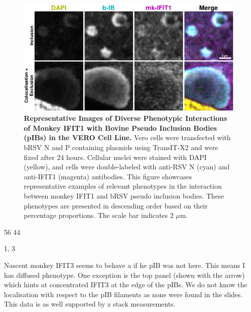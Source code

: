 \begin{figure}
    \centering
    \includegraphics[width=1\linewidth]{09. Chapter 4/Figs/01. pIB/02. IFIT1/09. i1-vero-bnbp.pdf}
    \caption[Representative Images of Diverse Phenotypic Interactions of Monkey IFIT1 with Bovine Pseudo Inclusion Bodies (pIBs) in the VERO Cell Line.]{\textbf{Representative Images of Diverse Phenotypic Interactions of Monkey IFIT1 with Bovine Pseudo Inclusion Bodies (pIBs) in the VERO Cell Line.} Vero cells were transfected with bRSV N and P containing plasmids using TransIT-X2 and were fixed after 24 hours. Cellular nuclei were stained with DAPI (yellow), and cells were double-labeled with anti-RSV N (cyan) and anti-IFIT1 (magenta) antibodies. This figure showcases representative examples of relevant phenotypes in the interaction between monkey IFIT1 and bRSV pseudo inclusion bodies. These phenotypes are presented in descending order based on their percentage proportions. The scale bar indicates 2 \(\mu \mbox{m}\).}
    \label{fig:Representative Images of Diverse Phenotypic Interactions of Monkey IFIT1 with Bovine Pseudo Inclusion Bodies (pIBs) in the VERO Cell Line}
\end{figure}

56 44

1, 3



Nascent monkey IFIT3 seems to behave a if he pIB was not here. This means I has diffused phenotype. One exception is the top panel (shown with the arrow) which hints at concentrated IFIT3 at the edge of the pIBs. We do not know the localisation with respect to the pIB filaments as none were found in the slides. This data is as well supported by z stack measurements.

